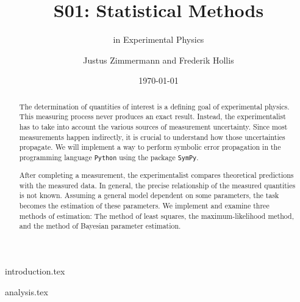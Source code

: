 \documentclass{scrartcl}
\title{S01: Statistical Methods}
\subtitle{in Experimental Physics}
\author{Justus Zimmermann and Frederik Hollis}
\date{\today}
\begin{document}
\maketitle

\begin{abstract}
    The determination of quantities of interest is a defining goal of experimental physics.
    This measuring process never produces an exact result.
    Instead, the experimentalist has to take into account the various sources of measurement uncertainty.
    Since most measurements happen indirectly, it is crucial to understand how those uncertainties propagate.
    We will implement a way to perform symbolic error propagation in the programming language \verb|Python| using the package \verb|SymPy|.

    After completing a measurement, the experimentalist compares theoretical predictions with the measured data.
    In general, the precise relationship of the measured quantities is not known.
    Assuming a general model dependent on some parameters, the task becomes the estimation of these parameters.
    We implement and examine three methods of estimation: 
    The method of least squares, the maximum-likelihood method, and the method of Bayesian parameter estimation.
\end{abstract}

\tableofcontents

\clearpage
{introduction.tex}

\clearpage
{analysis.tex}
\end{document}

